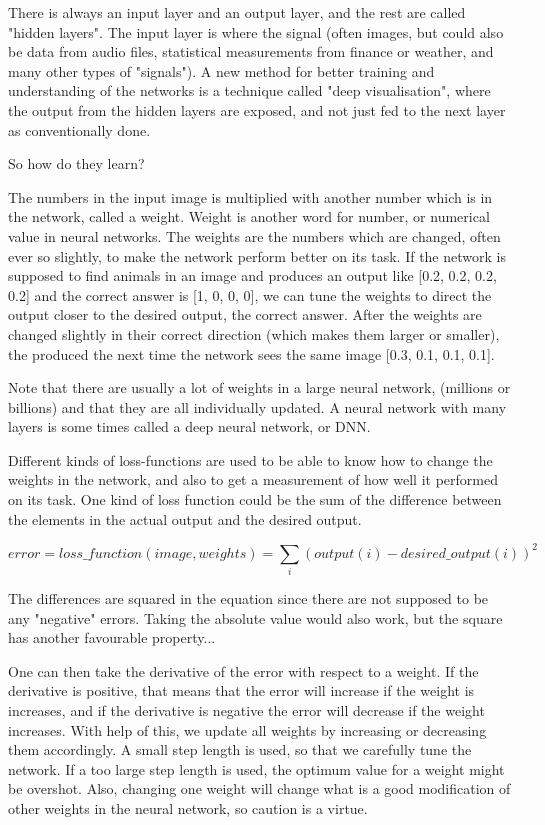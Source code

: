 There is always an input layer and an output layer, and the rest are called "hidden layers". The input layer is where the signal (often images, but could also be data from audio files, statistical measurements from finance or weather, and many other types of "signals"). A new method for better training and understanding of the networks is a technique called "deep visualisation", where the output from the hidden layers are exposed, and not just fed to the next layer as conventionally done. 

So how do they learn?

The numbers in the input image is multiplied with another number which is in the network, called a weight. Weight is another word for number, or numerical value in neural networks. The weights are the numbers which are changed, often ever so slightly, to make the network perform better on its task. If the network is supposed to find animals in an image and produces an output like [0.2, 0.2, 0.2, 0.2] and the correct answer is [1, 0, 0, 0], we can tune the weights to direct the output closer to the desired output, the correct answer. After the weights are changed slightly in their correct direction (which makes them larger or smaller), the produced the next time the network sees the same image [0.3, 0.1, 0.1, 0.1]. 

Note that there are usually a lot of weights in a large neural network, (millions or billions) and that they are all individually updated. A neural network with many layers is some times called a deep neural network, or DNN.  

Different kinds of loss-functions are used to be able to know how to change the weights in the network, and also to get a measurement of how well it performed on its task. One kind of loss function could be the sum of the difference between the elements in the actual output and the desired output. 

\begin{equation}
error = loss\_function(image, weights) = \sum\limits_{i} (output(i) - desired\_output(i))^2
\end{equation}


The differences are squared in the equation since there are not supposed to be any "negative" errors. Taking the absolute value would also work, but the square has another favourable property...

One can then take the derivative of the error with respect to a weight. If the derivative is positive, that means that the error will increase if the weight is increases, and if the derivative is negative the error will decrease if the weight increases. With help of this, we update all weights by increasing or decreasing them accordingly. A small step length is used, so that we carefully tune the network. If a too large step length is used, the optimum value for a weight might be overshot. Also, changing one weight will change what is a good modification of other weights in the neural network, so caution is a virtue. 


